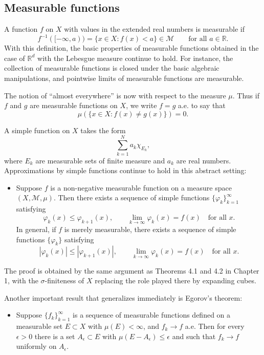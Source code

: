 \documentclass[11pt,openany]{book}
\begin{document}
\subsection*{Measurable functions}

A function $f$ on $X$ with values in the extended real numbers is measurable if
\[
f^{-1}([ -\infty,a))=\{x\in X:f(x)<a\}\in\mathcal M
\qquad\text{for all }a\in\mathbb R.
\]
With this definition, the basic properties of measurable functions obtained in the case of $\mathbb R^d$ with the Lebesgue measure continue to hold. For instance, the collection of measurable functions is closed under the basic algebraic manipulations, and pointwise limits of measurable functions are measurable.

The notion of ``almost everywhere'' is now with respect to the measure $\mu$. Thus if $f$ and $g$ are measurable functions on $X$, we write $f=g$ a.e. to say that
\[
\mu(\{x\in X:f(x)\neq g(x)\})=0.
\]

A simple function on $X$ takes the form
\[
\sum_{k=1}^N a_k\chi_{E_k},
\]
where $E_k$ are measurable sets of finite measure and $a_k$ are real numbers. Approximations by simple functions continue to hold in this abstract setting:
\begin{itemize}
\item Suppose $f$ is a non-negative measurable function on a measure space $(X,\mathcal M,\mu)$. Then there exists a sequence of simple functions $\{\varphi_k\}_{k=1}^{\infty}$ satisfying
\[
\varphi_k(x)\leq\varphi_{k+1}(x),
\qquad
\lim_{k\to\infty}\varphi_k(x)=f(x)
\quad\text{for all }x.
\]
In general, if $f$ is merely measurable, there exists a sequence of simple functions $\{\varphi_k\}$ satisfying
\[
|\varphi_k(x)|\leq|\varphi_{k+1}(x)|,
\qquad
\lim_{k\to\infty}\varphi_k(x)=f(x)
\quad\text{for all }x.
\]
\end{itemize}
The proof is obtained by the same argument as Theorems 4.1 and 4.2 in Chapter 1, with the $\sigma$-finiteness of $X$ replacing the role played there by expanding cubes.

Another important result that generalizes immediately is Egorov's theorem:
\begin{itemize}
\item Suppose $\{f_k\}_{k=1}^{\infty}$ is a sequence of measurable functions defined on a measurable set $E\subset X$ with $\mu(E)<\infty$, and $f_k\to f$ a.e. Then for every $\epsilon>0$ there is a set $A_\epsilon\subset E$ with $\mu(E-A_\epsilon)\leq\epsilon$ and such that $f_k\to f$ uniformly on $A_\epsilon$.
\end{itemize}
\end{document}
